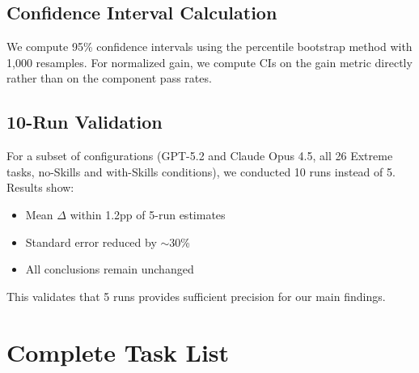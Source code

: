 \subsection{Confidence Interval Calculation}

We compute 95\% confidence intervals using the percentile bootstrap method with 1,000 resamples.
For normalized gain, we compute CIs on the gain metric directly rather than on the component pass rates.

\subsection{10-Run Validation}

For a subset of configurations (GPT-5.2 and Claude Opus 4.5, all 26 Extreme tasks, no-Skills and with-Skills conditions), we conducted 10 runs instead of 5. Results show:
\begin{itemize}[nosep]
    \item Mean $\Delta$ within 1.2pp of 5-run estimates
    \item Standard error reduced by $\sim$30\%
    \item All conclusions remain unchanged
\end{itemize}

This validates that 5 runs provides sufficient precision for our main findings.




\section{Complete Task List}
\label{app:task-list}

